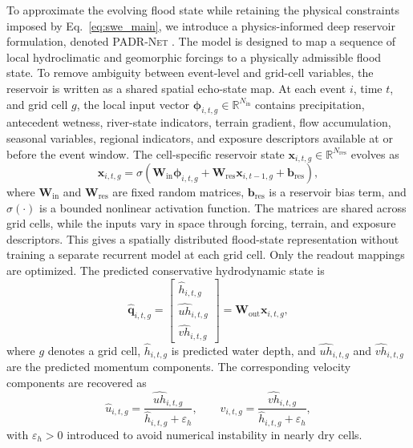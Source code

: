 \documentclass[pdflatex,sn-mathphys-ay]{sn-jnl}
\theoremstyle{thmstyleone}
\begin{document}
To approximate the evolving flood state while retaining the physical
constraints imposed by Eq.~\eqref{eq:swe_main}, we introduce a
physics-informed deep reservoir formulation, denoted \textsc{PADR-Net}
\citep{RAISSI2019686,Jaeger2001EchoState,LUKOSEVICIUS2009127}.
The model is designed to map a sequence of local hydroclimatic and
geomorphic forcings to a physically admissible flood state.  To remove
ambiguity between event-level and grid-cell variables, the reservoir is
written as a shared spatial echo-state map.  At each event $i$, time
$t$, and grid cell $g$, the local input vector
$\boldsymbol{\phi}_{i,t,g}\in\mathbb{R}^{N_{\mathrm{in}}}$ contains
precipitation, antecedent wetness, river-state indicators, terrain
gradient, flow accumulation, seasonal variables, regional indicators,
and exposure descriptors available at or before the event window.  The
cell-specific reservoir state
$\mathbf{x}_{i,t,g}\in\mathbb{R}^{N_{\mathrm{res}}}$ evolves as
\begin{equation}
  \mathbf{x}_{i,t,g}
  =
  \sigma
  \left(
    \mathbf{W}_{\mathrm{in}}\boldsymbol{\phi}_{i,t,g}
    +
    \mathbf{W}_{\mathrm{res}}\mathbf{x}_{i,t-1,g}
    +
    \mathbf{b}_{\mathrm{res}}
  \right),
  \label{eq:padr_state}
\end{equation}
where $\mathbf{W}_{\mathrm{in}}$ and $\mathbf{W}_{\mathrm{res}}$ are
fixed random matrices, $\mathbf{b}_{\mathrm{res}}$ is a reservoir bias
term, and $\sigma(\cdot)$ is a bounded nonlinear activation function.
The matrices are shared across grid cells, while the inputs vary in
space through forcing, terrain, and exposure descriptors.  This gives a
spatially distributed flood-state representation without training a
separate recurrent model at each grid cell.  Only the readout mappings
are optimized.  The predicted conservative hydrodynamic state is
\begin{equation}
  \hat{\mathbf{q}}_{i,t,g}
  =
  \begin{bmatrix}
    \hat{h}_{i,t,g} \\
    \widehat{uh}_{i,t,g} \\
    \widehat{vh}_{i,t,g}
  \end{bmatrix}
  =
  \mathbf{W}_{\mathrm{out}}
  \mathbf{x}_{i,t,g},
  \label{eq:padr_output}
\end{equation}
where $g$ denotes a grid cell, $\hat{h}_{i,t,g}$ is predicted water
depth, and $\widehat{uh}_{i,t,g}$ and $\widehat{vh}_{i,t,g}$ are the
predicted momentum components.  The corresponding velocity components
are recovered as
\begin{equation}
  \hat{u}_{i,t,g}
  =
  \frac{\widehat{uh}_{i,t,g}}
  {\hat{h}_{i,t,g}+\varepsilon_h},
  \qquad
  \hat{v}_{i,t,g}
  =
  \frac{\widehat{vh}_{i,t,g}}
  {\hat{h}_{i,t,g}+\varepsilon_h},
  \label{eq:padr_velocity}
\end{equation}
with $\varepsilon_h>0$ introduced to avoid numerical instability in
nearly dry cells.
\end{document}
